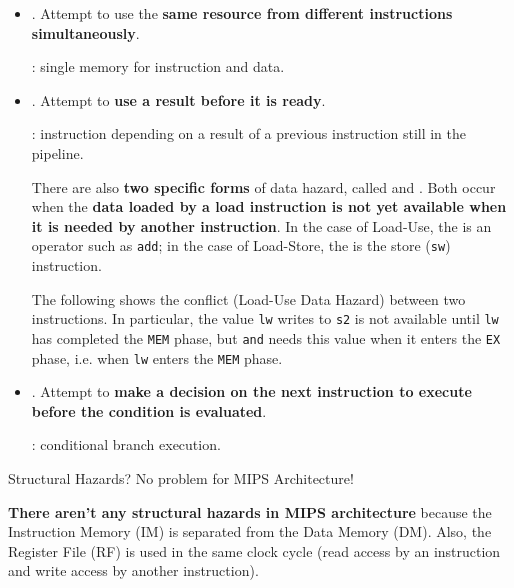 \begin{itemize}
    \item {}. Attempt to use the \textbf{same resource from different instructions simultaneously}.
    
    : single memory for instruction and data.
    

    \item {}. Attempt to \textbf{use a result before it is ready}.
    
    : instruction depending on a result of a previous instruction still in the pipeline.

    There are also \textbf{two specific forms} of data hazard, called  and . Both occur when the \textbf{data loaded by a load instruction is not yet available when it is needed by another instruction}. In the case of Load-Use, the  is an operator such as \texttt{add}; in the case of Load-Store, the  is the store (\texttt{sw}) instruction.

    The following  shows the conflict (Load-Use Data Hazard) between two instructions. In particular, the value \texttt{lw} writes to \texttt{s2} is not available until \texttt{lw} has completed the \texttt{MEM} phase, but \texttt{and} needs this value when it enters the \texttt{EX} phase, i.e. when \texttt{lw} enters the \texttt{MEM} phase.
    

    \item {}. Attempt to \textbf{make a decision on the next instruction to execute before the condition is evaluated}.
    
    : conditional branch execution.
\end{itemize}

\begin{flushleft}
    Structural Hazards? No problem for MIPS Architecture!
\end{flushleft}
\textbf{There aren't any structural hazards in MIPS architecture} because the Instruction Memory (IM) is separated from the Data Memory (DM). Also, the Register File (RF) is used in the same clock cycle (read access by an instruction and write access by another instruction).

\newpage

